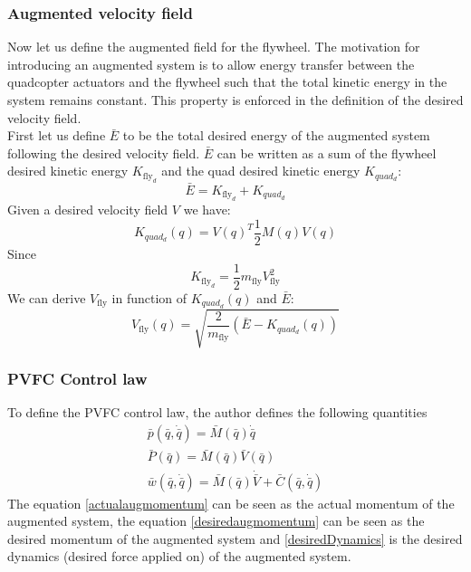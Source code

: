 \subsubsection{Augmented velocity field}
Now let us define the augmented field for the flywheel. The motivation for introducing an augmented system is
to allow energy transfer between the quadcopter actuators and the flywheel such that the total kinetic energy in the system remains constant.
This property is enforced in the definition of the desired velocity field. \\
First let us define $\bar{E}$ to be the total desired energy of the augmented system following the desired velocity field.
$\bar{E}$ can be written as a sum of the flywheel desired kinetic energy $K_{\text{fly}_{d}}$ and the quad desired kinetic energy $K_{quad_{d}}$: 
\begin{equation}
    \bar{E} = K_{\text{fly}_{d}} + K_{quad_{d}}
\end{equation}
Given a desired velocity field $V$ we have: 
\begin{equation}
    K_{quad_{d}}(q) = V(q)^T\frac{1}{2}M(q)V(q)
\end{equation}
Since 
\begin{equation}
    K_{\text{fly}_{d}} = \frac{1}{2} m_{\text{fly}} V^2_{\text{fly}}
\end{equation}
We can derive $V_{\text{fly}}$ in function of  $K_{quad_{d}}(q)$ and $\bar{E}$:
\begin{equation}
    V_{\text{fly}}(q) = \sqrt{\frac{2}{m_{\text{fly}}}(\bar{E}- K_{quad_{d}}(q))}
\end{equation}
\subsubsection{PVFC Control law}
To define the PVFC control law, the author defines the following quantities
\begin{align}
    \bar{p}(\bar{q}, \dot{\bar{q}}) = \bar{M}(\bar{q})\dot{\bar{q}} \label{actualaugmomentum}\\
    \bar{P}(\bar{q}) = \bar{M}(\bar{q})\bar{V}(\bar{q}) \label{desiredaugmomentum}\\
    \bar{w}(\bar{q}, \dot{\bar{q}}) = \bar{M}(\bar{q})\dot{\bar{V}} + \bar{C}(\bar{q}, \dot{\bar{q}}) \label{desiredDynamics}
\end{align}
The equation \ref{actualaugmomentum} can be seen as the actual momentum of the augmented system, the equation \ref{desiredaugmomentum} can be seen 
as the desired momentum of the augmented system and \ref{desiredDynamics} is the desired dynamics (desired force applied on) of the augmented system.


